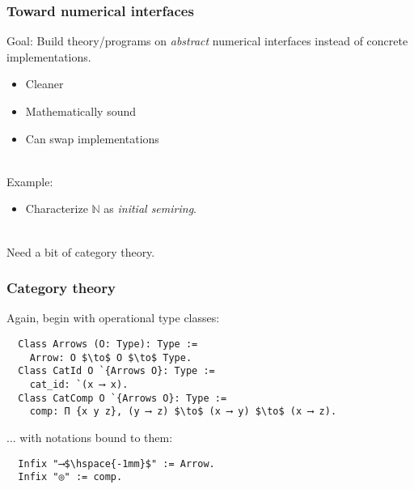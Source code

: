 \documentclass{beamer}
\begin{document}
\begin{frame}


\frametitle{Toward numerical interfaces}
Goal: Build theory/programs on \emph{abstract} numerical interfaces instead of concrete implementations.
\begin{itemize}
\item Cleaner
\item Mathematically sound
\item Can swap implementations
\end{itemize}

\ \\
Example:
\begin{itemize}
  \item[]Characterize $\mathbb{N}$ as \emph{initial semiring}. %
\end{itemize}

\ \\
Need a bit of category theory.
\end{frame}

\begin{frame}[fragile]
\frametitle{Category theory}

Again, begin with operational type classes:
\begin{lstlisting}
  Class Arrows (O: Type): Type :=
    Arrow: O $\to$ O $\to$ Type.
  Class CatId O `{Arrows O}: Type :=
    cat_id: `(x ⟶ x).
  Class CatComp O `{Arrows O}: Type :=
    comp: Π {x y z}, (y ⟶ z) $\to$ (x ⟶ y) $\to$ (x ⟶ z).
\end{lstlisting}
... with notations bound to them:
\begin{lstlisting}
  Infix "⟶$\hspace{-1mm}$" := Arrow.
  Infix "◎" := comp.
\end{lstlisting}
\end{frame}
\end{document}
